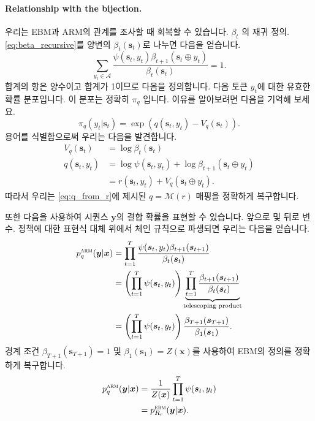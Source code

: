 \documentclass{article}
\def\s{{\bm{s}}}
\def\x{{\bm{x}}}
\def\y{{\bm{y}}}
\def\cA{{\mathcal{A}}}
\def\cM{{\mathcal{M}}}
\newcommand{\Rsub}[1]{R_{#1}}
\def\arm{{\textsc{arm}}}
\def\ebm{{\textsc{ebm}}}
\def\augvoc{\cA}
\begin{document}
\paragraph{Relationship with the bijection.}

우리는 EBM과 ARM의 관계를 조사할 때 회복할 수 있습니다.
$\beta_t$ 의 재귀 정의. 
\eqref{eq:beta_recursive}를 양변의 $\beta_t(\s_t)$로 나누면 다음을 얻습니다.
 \begin{equation} 
 \sum _{y_t \in \augvoc } \frac { \psi ( \s _t, y_t) \beta _{t+1}( \s _t \oplus 
y_t)}{ \beta _t( \s _t)} = 1.
 \end{equation} 
합계의 항은 양수이고 합계가 1이므로 다음을 정의합니다.
다음 토큰 $y_t$에 대한 유효한 확률 분포입니다. 이
분포는 정확히 $\pi_q$ 입니다. 이유를 알아보려면 다음을 기억해 보세요.
 \begin{equation} 
 \pi _q(y_t | \s _t) = \exp (q( \s _t, y_t) - V_q( \s _t)).
 \end{equation} 
용어를 식별함으로써 우리는 다음을 발견합니다.
 \begin{align} 
V_q( \s _t) &= \log \beta _t( \s _t) \\
q( \s _t, y_t) &= \log \psi ( \s _t, y_t) + \log \beta _{t+1}( \s _t \oplus y_t) \\
&= r( \s _t, y_t) + V_q( \s _t \oplus y_t).
 \end{align} 
따라서 우리는 \eqref{eq:q_from_r}에 제시된 $q = \cM(r)$ 매핑을 정확하게 복구합니다.

또한 다음을 사용하여 시퀀스 $\y$의 결합 확률을 표현할 수 있습니다.
앞으로 및 뒤로 변수. 정책에 대한 표현식 대체
위에서 체인 규칙으로 파생되면 우리는 다음을 얻습니다.
 \begin{align} 
p^ \arm _q( \y | \x ) 
&= \prod _{t=1}^T \frac { \psi ( \s _t, y_t) \beta _{t+1}( \s _{t+1})}{ \beta _t( \s _t)} \\
&= \left ( \prod _{t=1}^T \psi ( \s _t, y_t) \right ) \underbrace { \prod _{t=1}^T
 \frac { \beta _{t+1}( \s _{t+1})}{ \beta _t( \s _t)}}_{ \text{telescoping product} } \\
&= \left ( \prod _{t=1}^T \psi ( \s _t, y_t) \right )
 \frac { \beta _{T+1}( \s _{T+1})}{ \beta _1( \s _1)}.
 \end{align} 
경계 조건 $\beta_{T+1}(\s_{T+1}) = 1$ 및 $\beta_1(\s_1) =
Z(\x)$를 사용하여 EBM의 정의를 정확하게 복구합니다.
 \begin{align} 
p^ \arm _q( \y | \x ) &= \frac{1} {Z( \x )} \prod _{t=1}^T \psi ( \s _t, y_t) \\
                  &= p^ \ebm _{ \Rsub{r} }( \y | \x ).
 \end{align}
\end{document}
